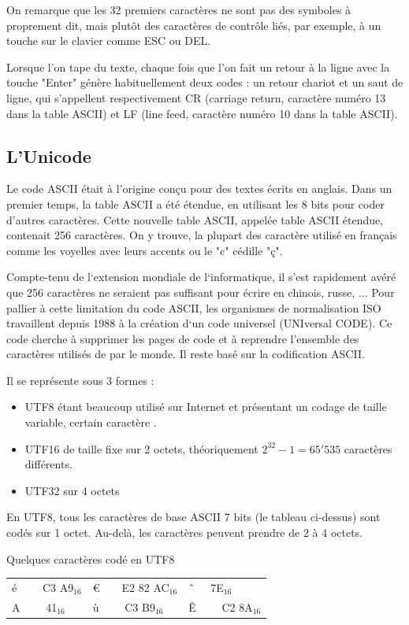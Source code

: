 On remarque que les 32 premiers caractères ne sont pas des symboles à proprement dit, mais plutôt des caractères de contrôle liés, par exemple, à un touche sur le clavier comme ESC ou DEL.
\begin{eclairage}
	Lorsque l'on tape du texte, chaque fois que l'on fait un retour à la ligne avec la touche "Enter" génère habituellement deux codes : un retour chariot et un saut de ligne, qui s'appellent respectivement CR (carriage return, caractère numéro 13 dans la table ASCII) et LF (line feed, caractère numéro 10 dans la table ASCII).

\end{eclairage}
	
\subsection{L'Unicode}
Le code ASCII était à l’origine conçu pour des textes écrits en anglais. Dans un premier temps, la table ASCII a été étendue, en utilisant les 8 bits pour coder d'autres caractères. Cette nouvelle table ASCII, appelée table ASCII étendue, contenait 256 caractères. On y trouve, la plupart des caractère utilisé en français comme les voyelles avec leurs accents ou le "c" cédille "ç".

Compte-tenu  de  l‘extension  mondiale  de  l‘informatique, il s'est rapidement avéré que 256 caractères ne seraient pas suffisant pour écrire en chinois, russe, ... Pour pallier à cette limitation du code ASCII, les  organismes  de  normalisation  ISO  travaillent  depuis 1988 à la création d‘un code universel (UNIversal CODE). Ce code cherche à supprimer les pages de code et à reprendre l'ensemble des caractères utilisés de par le monde. Il reste basé sur la codification ASCII. 

Il se représente sous 3 formes : 
\begin{itemize}
	\item UTF8 étant beaucoup utilisé sur Internet et présentant un codage de taille variable, certain caractère . 
	\item UTF16 de taille fixe sur 2 octets, théoriquement $2^{32}-1 =65'535$ caractères différents.
	\item UTF32 sur 4 octets
\end{itemize}

En  UTF8,  tous  les  caractères  de  base  ASCII  7  bits (le tableau ci-dessus) sont  codés  sur  1  octet.  Au-delà,  les caractères peuvent prendre de 2 à 4 octets. 
\begin{myexample}
	Quelques caractères codé en UTF8\\
	
	\hspace{1cm}
	\begin{tabular*}{14.5cm}{@{\extracolsep{\fill}}  l  l  l }
		é \ \ \ \ \small{C3 A9$_{16}$}  &  \euro \ \ \ \ \small{E2 82 AC$_{16}$}  &  \~ \ \ \ \ \small{7E$_{16}$}  \\
		A \ \ \ \ \small{41$_{16}$}  &  ù \ \ \ \ \small{C3 B9$_{16}$}  & Ê \ \ \ \ \small{C2 8A$_{16}$}   \\
	\end{tabular*}
\end{myexample}



